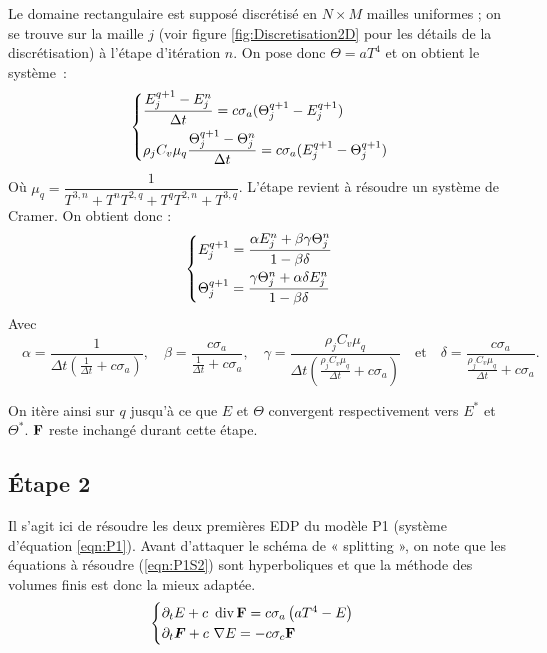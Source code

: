 Le domaine rectangulaire est supposé discrétisé en $N \times M$ mailles uniformes ; on se trouve sur la maille $j$ (voir figure \ref{fig:Discretisation2D} pour les détails de la discrétisation) à l'étape d'itération $n$. On pose donc $\Theta = aT^4$ et on obtient le système :
\begingroup
\normalsize
\begin{equation*}
    \begin{dcases}
     \dfrac{E_j^{q+1} - E_j^{n}}{\Delta t} = c \sigma_a ( \Theta_j^{q+1} - E_j^{q+1}) \\
     \rho_j C_v \mu_q \dfrac{\Theta_j^{q+1} - \Theta_j^{n}}{\Delta t} = c \sigma_a (E_j^{q+1} - \Theta_j^{q+1}) 
    \end{dcases}
\end{equation*}
\endgroup
Où $\mu_q = \dfrac{1}{T^{3,n} + T^{n}T^{2,q} + T^{q}T^{2,n} + T^{3,q}}$.
L'étape revient à résoudre un système de Cramer. On obtient donc :
\begin{equation} 
    \begin{dcases}
     E_j^{q+1} = \dfrac{\alpha E_j^n + \beta \gamma \Theta_j^n}{1 - \beta \delta} \\
     \Theta_j^{q+1} = \dfrac{\gamma \Theta_j^n + \alpha \delta E_j^n}{1 - \beta \delta} 
    \end{dcases}
\label{eqn:Step1}
\end{equation}
Avec $\quad  \alpha = \dfrac{1}{\Delta t \left( \frac{1}{\Delta t} + c \sigma_a \right)} ,\quad 
\beta = \dfrac{c \sigma_a}{\frac{1}{\Delta t} + c \sigma_a} ,\quad 
\gamma = \dfrac{\rho_j C_v \mu_q}{\Delta t \left( \frac{\rho_j C_v \mu_q}{\Delta t} + c \sigma_a \right)} \quad \text{et} \quad  
\delta = \dfrac{c \sigma_a}{\frac{\rho_j C_v \mu_q}{\Delta t} + c \sigma_a}.$

On itère ainsi sur $q$ jusqu'à ce que $E$ et $\Theta$ convergent respectivement vers $E^*$ et $\Theta^*$. $\mathbf{F}$ reste inchangé durant cette étape.

\subsection{Étape 2}
Il s'agit ici de résoudre les deux premières EDP du modèle P1 (système d'équation \ref{eqn:P1}). Avant d'attaquer le schéma de « splitting », on note que les équations à résoudre (\ref{eqn:P1S2}) sont hyperboliques et que la méthode des volumes finis est donc la mieux adaptée.
\begingroup
\normalsize
\begin{equation}
    \begin{cases}
     \partial_tE + c \ \operatorname {div} \mathbf{F} = c\sigma_a\left(aT^4-E\right)\\
     \partial_t\bm{F} + c \ \nabla E = -c\sigma_c \mathbf{F} \\
    \end{cases}
\label{eqn:P1S2}
\end{equation}
\endgroup


